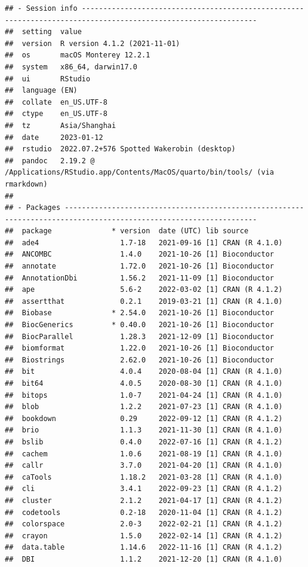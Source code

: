 \documentclass[
]{book}
\begin{document}
\begin{verbatim}
## - Session info ---------------------------------------------------------------------------------------------------------------
##  setting  value
##  version  R version 4.1.2 (2021-11-01)
##  os       macOS Monterey 12.2.1
##  system   x86_64, darwin17.0
##  ui       RStudio
##  language (EN)
##  collate  en_US.UTF-8
##  ctype    en_US.UTF-8
##  tz       Asia/Shanghai
##  date     2023-01-12
##  rstudio  2022.07.2+576 Spotted Wakerobin (desktop)
##  pandoc   2.19.2 @ /Applications/RStudio.app/Contents/MacOS/quarto/bin/tools/ (via rmarkdown)
## 
## - Packages -------------------------------------------------------------------------------------------------------------------
##  package              * version  date (UTC) lib source
##  ade4                   1.7-18   2021-09-16 [1] CRAN (R 4.1.0)
##  ANCOMBC                1.4.0    2021-10-26 [1] Bioconductor
##  annotate               1.72.0   2021-10-26 [1] Bioconductor
##  AnnotationDbi          1.56.2   2021-11-09 [1] Bioconductor
##  ape                    5.6-2    2022-03-02 [1] CRAN (R 4.1.2)
##  assertthat             0.2.1    2019-03-21 [1] CRAN (R 4.1.0)
##  Biobase              * 2.54.0   2021-10-26 [1] Bioconductor
##  BiocGenerics         * 0.40.0   2021-10-26 [1] Bioconductor
##  BiocParallel           1.28.3   2021-12-09 [1] Bioconductor
##  biomformat             1.22.0   2021-10-26 [1] Bioconductor
##  Biostrings             2.62.0   2021-10-26 [1] Bioconductor
##  bit                    4.0.4    2020-08-04 [1] CRAN (R 4.1.0)
##  bit64                  4.0.5    2020-08-30 [1] CRAN (R 4.1.0)
##  bitops                 1.0-7    2021-04-24 [1] CRAN (R 4.1.0)
##  blob                   1.2.2    2021-07-23 [1] CRAN (R 4.1.0)
##  bookdown               0.29     2022-09-12 [1] CRAN (R 4.1.2)
##  brio                   1.1.3    2021-11-30 [1] CRAN (R 4.1.0)
##  bslib                  0.4.0    2022-07-16 [1] CRAN (R 4.1.2)
##  cachem                 1.0.6    2021-08-19 [1] CRAN (R 4.1.0)
##  callr                  3.7.0    2021-04-20 [1] CRAN (R 4.1.0)
##  caTools                1.18.2   2021-03-28 [1] CRAN (R 4.1.0)
##  cli                    3.4.1    2022-09-23 [1] CRAN (R 4.1.2)
##  cluster                2.1.2    2021-04-17 [1] CRAN (R 4.1.2)
##  codetools              0.2-18   2020-11-04 [1] CRAN (R 4.1.2)
##  colorspace             2.0-3    2022-02-21 [1] CRAN (R 4.1.2)
##  crayon                 1.5.0    2022-02-14 [1] CRAN (R 4.1.2)
##  data.table             1.14.6   2022-11-16 [1] CRAN (R 4.1.2)
##  DBI                    1.1.2    2021-12-20 [1] CRAN (R 4.1.0)

\end{verbatim}
\end{document}
